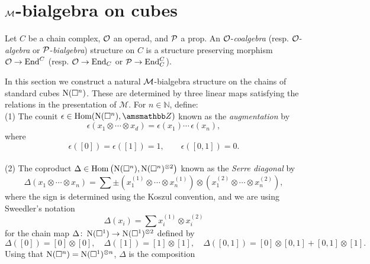 
\section{$\M$-bialgebra on cubes} \label{s:action}

Let $C$ be a chain complex, $\O$ an operad, and $\P$ a prop.
An $\O$-\textit{coalgebra} (resp. $\O$-\textit{algebra} or $\P$-\textit{bialgebra}) structure on $C$ is a structure preserving morphism $\O \to \End^C$ (resp. $\O \to \End_C$ or $\P \to \End_C^C$).

In this section we construct a natural $\M$-bialgebra structure on the chains of standard cubes $\cchains(\cube^n)$.
These are determined by three linear maps satisfying the relations in the presentation of $\mathcal M$.
For $n \in \mathbb{N}$, define: \vspace*{5pt} \\
(1) The counit $\epsilon \in \Hom(\cchains(\square^n), \Z)$ known as the \textit{augmentation} by
\begin{equation*}
\epsilon \left( x_1 \otimes \cdots \otimes x_d \right) = \epsilon(x_1) \cdots \, \epsilon(x_n),
\end{equation*}
where
\begin{equation*}
\epsilon([0]) = \epsilon([1]) = 1, \qquad \epsilon([0, 1]) = 0.
\end{equation*} \vspace*{-6pt} \\
(2) The coproduct $\Delta \in \Hom \left( \cchains(\square^n), \cchains(\square^n)^{\otimes 2} \right)$ known as the \textit{Serre diagonal} by
\begin{equation*}	
\Delta (x_1 \otimes \cdots \otimes x_n) = 	
\sum \pm \left( x_1^{(1)} \otimes \cdots \otimes x_n^{(1)} \right) \otimes 	
\left( x_1^{(2)} \otimes \cdots \otimes x_n^{(2)} \right),	
\end{equation*}	
where the sign is determined using the Koszul convention, and we are using Sweedler's notation
\begin{equation*}	
\Delta(x_i) = \sum x_i^{(1)} \otimes x_i^{(2)}
\end{equation*}
for the chain map $\Delta \colon \cchains(\square^1) \to \cchains(\square^1)^{\otimes 2}$ defined by
\begin{equation*}
\Delta([0]) = [0] \otimes [0], \quad \Delta([1]) = [1] \otimes [1], \quad \Delta([0, 1]) = [0] \otimes [0, 1] + [0, 1] \otimes [1].
\end{equation*}
Using that $\cchains(\square^n) = \cchains(\square^1)^{\otimes n}$, $\Delta$ is the composition
